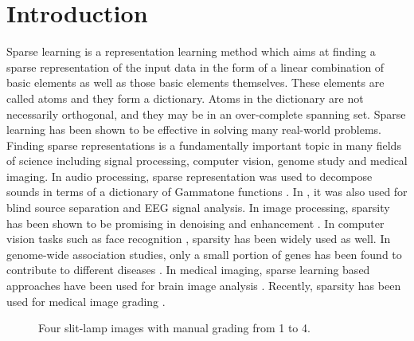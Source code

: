 \documentclass[journal]{IEEEtran}
\begin{document}
\section{Introduction}\label{introduction}
  Sparse learning is a representation learning method which aims at finding a sparse representation of the input data in the form of a linear combination of basic elements as well as those basic elements themselves. These elements are called atoms and they form a dictionary. Atoms in the dictionary are not necessarily  orthogonal, and they may be in an over-complete spanning set.
Sparse  learning has been  shown to be effective in solving many
real-world problems.   Finding  sparse
representations  is a fundamentally important topic in many fields of
science including  signal
processing, computer vision, genome study and medical imaging.
  In audio processing, sparse representation was used to decompose  sounds in terms of a dictionary of Gammatone functions   \cite{Adiloglu12}. In \cite{Yuanqing2004}, it was also used   for blind source separation and EEG signal analysis.  In image processing, sparsity has been shown to be promising in denoising and enhancement  \cite{BM4D, Fang13, Fang12, Elad06, Kafieh15, cheng14, chengjun16, feikou2013}.  In computer vision tasks such as face recognition \cite{Wright09, zhanglei2010,  LU2013111, Xing2013}, sparsity  has been widely used as well.  In genome-wide association studies, only a small portion of genes has been found to contribute to different diseases \cite{Golub99, zhangzhuo12, Li2015}.
  In medical imaging, sparse learning based approaches have been used for brain  image analysis \cite{Aljabar2009MultiatlasBS, varoquaux:inria-00588898, Roy2015}. Recently, sparsity has been used  for medical image grading \cite{Xu13, CJ15}.
  \begin{figure}
 	\caption{Four slit-lamp images with manual grading from 1 to 4.} \label{fig0}
 \end{figure}
\end{document}
